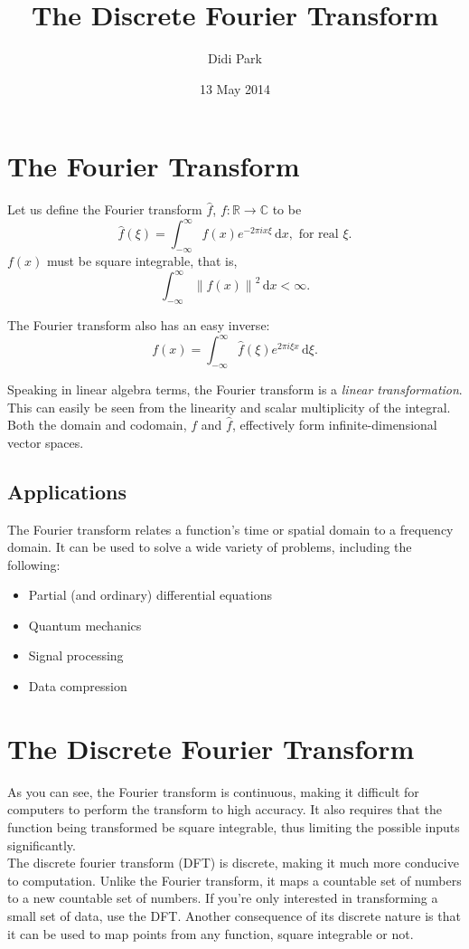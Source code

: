 \documentclass[11pt]{article}
\title{The Discrete Fourier Transform}
\author{Didi Park}
\date{13 May 2014}
\begin{document}
\maketitle

\section{The Fourier Transform}
Let us define the Fourier transform $\hat{f}$, $f: \mathbb{R}\rightarrow\mathbb{C}$ to be
$$\hat{f}(\xi)=\int_{-\infty}^{\infty}f(x)e^{-2\pi i x \xi}\, \mathrm{d}x, \textrm{ for real }\xi.$$
$f(x)$ must be square integrable, that is,
$$\int_{-\infty}^{\infty} {\| f(x) \|}^2\,  \mathrm{d}x <\infty.$$

The Fourier transform also has an easy inverse:
$$f(x)=\int_{-\infty}^{\infty} \hat{f}(\xi)e^{2\pi i \xi x}\, \mathrm{d}\xi.$$

Speaking in linear algebra terms, the Fourier transform is a \emph{linear transformation}. This can easily be seen from the linearity and scalar multiplicity of the integral. Both the domain and codomain, $f$ and $\hat{f}$, effectively form infinite-dimensional vector spaces.
\subsection{Applications}
The Fourier transform relates a function's time or spatial domain to a frequency domain. 
It can be used to solve a wide variety of problems, including the following:
\begin{itemize}
\item Partial (and ordinary) differential equations
\item Quantum mechanics
\item Signal processing
\item Data compression
\end{itemize}

\section{The Discrete Fourier Transform}
As you can see, the Fourier transform is continuous, making it difficult for computers to perform the transform to high accuracy. It also requires that the function being transformed be square integrable, thus limiting the possible inputs significantly.\\
The discrete fourier transform (DFT) is discrete, making it much more conducive to computation. Unlike the Fourier transform, it maps a countable set of numbers to a new countable set of numbers. If you're only interested in transforming a small set of data, use the DFT. Another consequence of its discrete nature is that it can be used to map points from any function, square integrable or not. 
\end{document}
